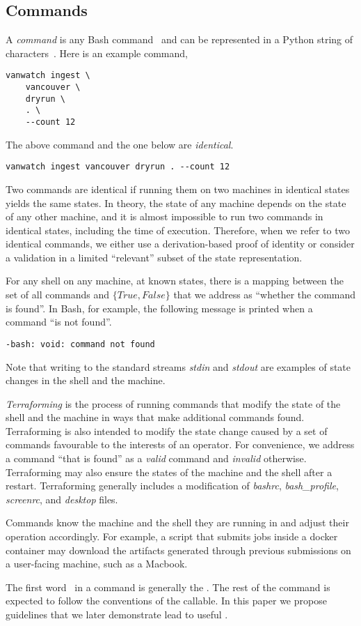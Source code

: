 \subsection{Commands}\label{commands}

A \emph{command} is any Bash command~\cite{shell_syntax} and can be represented in a Python string of characters~\cite{python_string}. Here is an example command,
%
\begin{verbatim}
vanwatch ingest \
    vancouver \
    dryrun \
    . \
    --count 12
\end{verbatim}
%
The above command and the one below are \emph{identical}.
%
\begin{verbatim}
vanwatch ingest vancouver dryrun . --count 12
\end{verbatim}
%
Two commands are identical if running them on two machines in identical states yields the same states. In theory, the state of any machine depends on the state of any other machine, and it is almost impossible to run two commands in identical states, including the time of execution. Therefore, when we refer to two identical commands, we either use a derivation-based proof of identity or consider a validation in a limited ``relevant'' subset of the state representation.

For any shell on any machine, at known states, there is a mapping between the set of all commands and $\{True,False\}$ that we address as ``whether the command is found''. In Bash, for example, the following message is printed when a command ``is not found''.
%
\begin{verbatim}
-bash: void: command not found
\end{verbatim}
%
Note that writing to the standard streams \emph{stdin} and \emph{stdout} are examples of state changes in the shell and the machine. 

\emph{Terraforming} is the process of running commands that modify the state of the shell and the machine in ways that make additional commands found. Terraforming is also intended to modify the state change caused by a set of commands favourable to the interests of an operator. For convenience, we address a command ``that is found'' as a \emph{valid} command and \emph{invalid} otherwise. Terraforming may also ensure the states of the machine and the shell after a restart. Terraforming generally includes a modification of \emph{bashrc}, \emph{bash\_profile}, \emph{screenrc}, and \emph{desktop} files.

Commands know the machine and the shell they are running in and adjust their operation accordingly. For example, a script that submits jobs inside a docker container may download the artifacts generated through previous submissions on a user-facing machine, such as a Macbook. 

The first word~\cite{shell_syntax} in a command is generally the \keyword{callables}. The rest of the command is expected to follow the conventions of the callable. In this paper we propose guidelines that we later demonstrate lead to useful \keyword{expansions}.



